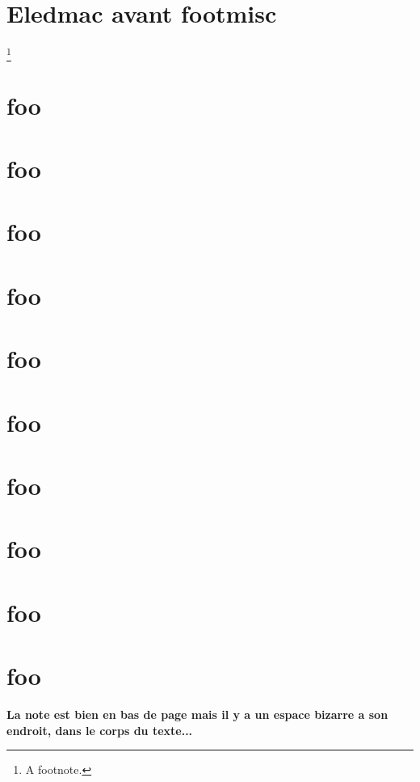 \documentclass{book}
\begin{document}
 
\section{Eledmac avant footmisc}
 
\kant[7-8]
 

 \beginnumbering
 \pstart\kant[2]\footnote{A footnote.}\kant[3]\pend
 \endnumbering

 
\section{foo}
\section{foo}
\section{foo}
\section{foo}
\section{foo}
\section{foo}
\section{foo}
\section{foo}
\section{foo}
\section{foo}
 
\Large\bf La note est bien en bas de page mais il y a  un espace bizarre a
son endroit, dans le corps du texte...
 
 
\end{document}
